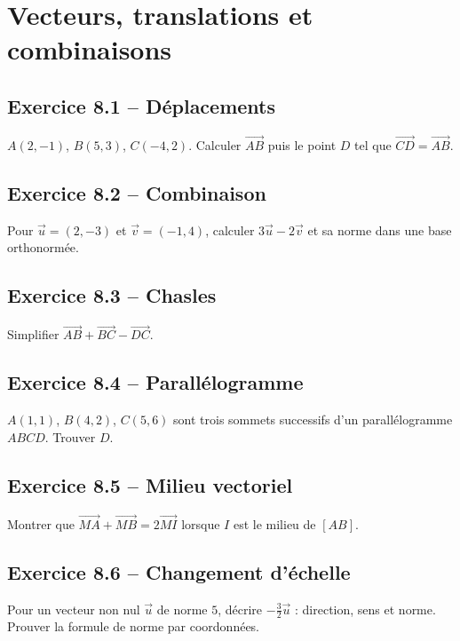 \chapter{Vecteurs, translations et combinaisons}
\section*{Exercice 8.1 -- Déplacements}
$A(2,-1)$, $B(5,3)$, $C(-4,2)$. Calculer $\overrightarrow{AB}$ puis le point $D$ tel que $\overrightarrow{CD}=\overrightarrow{AB}$.

\section*{Exercice 8.2 -- Combinaison}
Pour $\vec u=(2,-3)$ et $\vec v=(-1,4)$, calculer $3\vec u-2\vec v$ et sa norme dans une base orthonormée.

\section*{Exercice 8.3 -- Chasles}
Simplifier $\overrightarrow{AB}+\overrightarrow{BC}-\overrightarrow{DC}$.

\section*{Exercice 8.4 -- Parallélogramme}
$A(1,1)$, $B(4,2)$, $C(5,6)$ sont trois sommets successifs d'un parallélogramme $ABCD$. Trouver $D$.

\section*{Exercice 8.5 -- Milieu vectoriel}
Montrer que $\overrightarrow{MA}+\overrightarrow{MB}=2\overrightarrow{MI}$ lorsque $I$ est le milieu de $[AB]$.

\section*{Exercice 8.6 -- Changement d'échelle}
Pour un vecteur non nul $\vec u$ de norme $5$, décrire $-\tfrac32\vec u$ : direction, sens et norme. Prouver la formule de norme par coordonnées.
